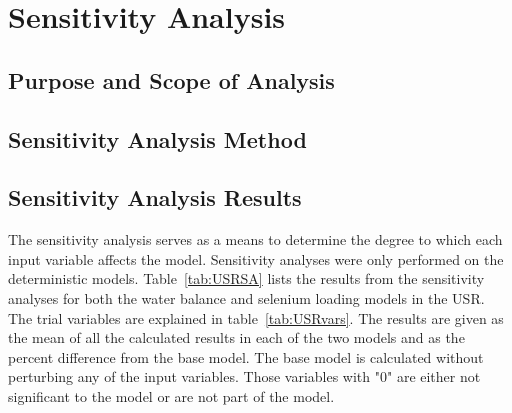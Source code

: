 \chapter{Sensitivity Analysis}
\label{chap:SensitivityAnalysis}

\begin{linenumbers}
\section{Purpose and Scope of Analysis}
\label{sec:PurposeAndScope}

\clearpage{}
\section{Sensitivity Analysis Method}
\label{sec:SAMethod}

\clearpage{}
\section{Sensitivity Analysis Results}
\label{sec:SAResults}

The sensitivity analysis serves as a means to determine the degree to which each input variable affects the model.  Sensitivity analyses were only performed on the deterministic models. Table~\ref{tab:USRSA} lists the results from the sensitivity analyses for both the water balance and selenium loading models in the USR.  The trial variables are explained in table~\ref{tab:USRvars}.  The results are given as the mean of all the calculated results in each of the two models and as the percent difference from the base model.  The base model is calculated without perturbing any of the input variables.  Those variables with "0" are either not significant to the model or are not part of the model.


\end{linenumbers}
